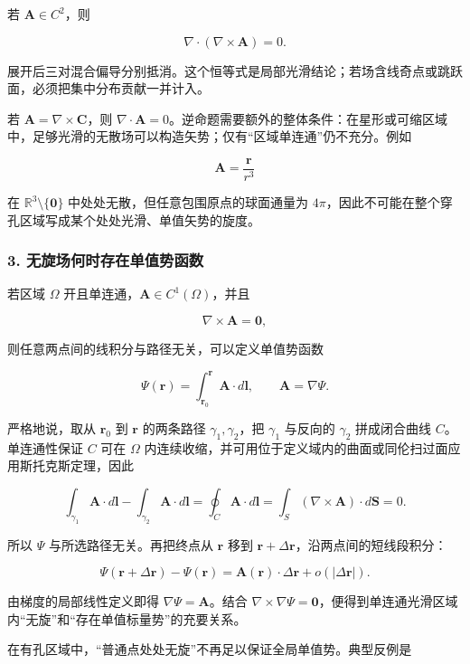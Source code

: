 若 \(\mathbf A\in C^2\)，则

\[
\boxed{
\nabla\cdot(\nabla\times\mathbf A)=0
}.
\]

展开后三对混合偏导分别抵消。这个恒等式是局部光滑结论；若场含线奇点或跳跃面，必须把集中分布贡献一并计入。

若 \(\mathbf A=\nabla\times\mathbf C\)，则
\(\nabla\cdot\mathbf A=0\)。逆命题需要额外的整体条件：在星形或可缩区域中，足够光滑的无散场可以构造矢势；仅有``区域单连通''仍不充分。例如

\[
\mathbf A=\frac{\mathbf r}{r^3}
\]

在 \(\mathbb R^3\setminus\{\mathbf0\}\)
中处处无散，但任意包围原点的球面通量为
\(4\pi\)，因此不可能在整个穿孔区域写成某个处处光滑、单值矢势的旋度。

\subsubsection{3.
无旋场何时存在单值势函数}\label{m1:ux65e0ux65cbux573aux4f55ux65f6ux5b58ux5728ux5355ux503cux52bfux51fdux6570}

若区域 \(\Omega\) 开且单连通，\(\mathbf A\in C^1(\Omega)\)，并且

\[
\nabla\times\mathbf A=\mathbf0,
\]

则任意两点间的线积分与路径无关，可以定义单值势函数

\[
\Psi(\mathbf r)
=
\int_{\mathbf r_0}^{\mathbf r}\mathbf A\cdot d\mathbf l,
\qquad
\mathbf A=\nabla\Psi.
\]

严格地说，取从 \(\mathbf r_0\) 到 \(\mathbf r\) 的两条路径
\(\gamma_1,\gamma_2\)，把 \(\gamma_1\) 与反向的 \(\gamma_2\)
拼成闭合曲线 \(C\)。单连通性保证 \(C\) 可在 \(\Omega\)
内连续收缩，并可用位于定义域内的曲面或同伦扫过面应用斯托克斯定理，因此

\[
\int_{\gamma_1}\mathbf A\cdot d\mathbf l
-\int_{\gamma_2}\mathbf A\cdot d\mathbf l
=\oint_C\mathbf A\cdot d\mathbf l
=\int_S(\nabla\times\mathbf A)\cdot d\mathbf S
=0.
\]

所以 \(\Psi\) 与所选路径无关。再把终点从 \(\mathbf r\) 移到
\(\mathbf r+\Delta\mathbf r\)，沿两点间的短线段积分：

\[
\Psi(\mathbf r+\Delta\mathbf r)-\Psi(\mathbf r)
=\mathbf A(\mathbf r)\cdot\Delta\mathbf r
+o(|\Delta\mathbf r|).
\]

由梯度的局部线性定义即得 \(\nabla\Psi=\mathbf A\)。结合
\(\nabla\times\nabla\Psi=\mathbf0\)，便得到单连通光滑区域内``无旋''和``存在单值标量势''的充要关系。

在有孔区域中，``普通点处处无旋''不再足以保证全局单值势。典型反例是

